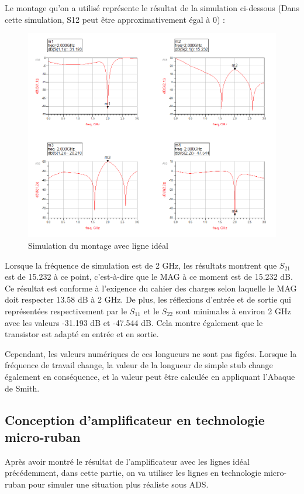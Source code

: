 \documentclass[french]{article}
\begin{document}
Le montage qu’on a utilisé représente le résultat de la simulation ci-dessous (Dans cette simulation, S12 peut être approximativement égal à 0) :
\begin{figure}[H]
	\centering
	\includegraphics[width=1\linewidth]{../5SynthAmp/ligne_ideal_Sparametres}
	\caption{Simulation du montage avec ligne idéal}
	\label{fig:ligne_ideal_Sparametres}
\end{figure}

Lorsque la fréquence de simulation est de 2 GHz, les résultats montrent que $S_{21}$ est de 15.232 à ce point, c'est-à-dire que le MAG à ce moment est de 15.232 dB. Ce résultat est conforme à l'exigence du cahier des charges selon laquelle le MAG doit respecter 13.58 dB à 2 GHz. De plus, les réflexions d’entrée et de sortie qui représentées respectivement par le $S_{11}$ et le $S_{22}$ sont minimales à environ 2 GHz avec les valeurs -31.193 dB et -47.544 dB. Cela montre également que le transistor est adapté en entrée et en sortie.

Cependant, les valeurs numériques de ces longueurs ne sont pas figées. Lorsque la fréquence de travail change, la valeur de la longueur de simple stub change également en conséquence, et la valeur peut être calculée en appliquant l’Abaque de Smith.

\subsection{Conception d’amplificateur en technologie micro-ruban}
Après avoir montré le résultat de l’amplificateur avec les lignes idéal précédemment, dans cette partie, on va utiliser les lignes en technologie micro-ruban pour simuler une situation plus réaliste sous ADS.
\end{document}
